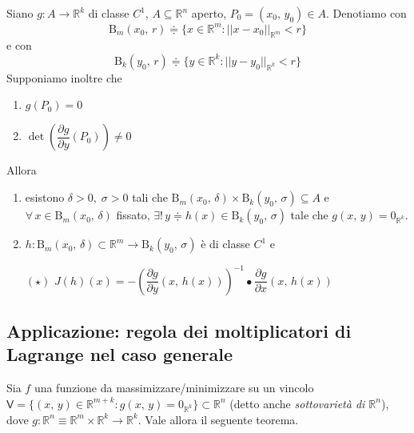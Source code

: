 \begin{thm}
Siano $g : A \longrightarrow \mathbb{R}^k$ di classe $C^1$, $A \subseteq \mathbb{R}^n$ aperto, $P_0 = (x_0,\,y_0) \in A$. Denotiamo con
$$
\mathrm{B}_m(x_0,\,r) \doteqdot \lbrace x \in \mathbb{R}^m : ||x-x_0||_{\mathbb{R}^m} < r \rbrace
$$
e con
$$
\mathrm{B}_k(y_0,\,r) \doteqdot \lbrace y \in \mathbb{R}^k : ||y-y_0||_{\mathbb{R}^k} < r \rbrace
$$
Supponiamo inoltre che
\begin{enumerate}[labelindent=\parindent,leftmargin=*,label=\textnormal{(\roman*)},start=1]
\item $g(P_0) = 0$
\item $\det \left( \dfrac{\partial g}{\partial y}(P_0) \right) \neq 0$
\end{enumerate}
Allora
\begin{enumerate}[labelindent=\parindent,leftmargin=*,label=\textnormal{(D\arabic*)},start=1]
\item esistono $\delta > 0,\; \sigma > 0$ tali che $\mathrm{B}_m(x_0,\,\delta) \times \mathrm{B}_k(y_0,\,\sigma) \subseteq A$ e $\forall \, x \in \mathrm{B}_m(x_0,\,\delta)$ fissato, $\exists ! \, y \doteqdot h(x) \in \mathrm{B}_k(y_0,\,\sigma)$ tale che $g(x,\,y) = 0_{\mathbb{R}^k}$.

\item $h : \mathrm{B}_m(x_0,\,\delta) \subset \mathbb{R}^m \longrightarrow \mathrm{B}_k(y_0,\,\sigma)$ è di classe $C^1$ e
\begin{center}
$\mathrm{(\star)}$
\hfill
$\displaystyle
J(h)(x) = -
\left( \dfrac{\partial g}{\partial y}(x,\,h(x)) \right)^{-1}
\bullet
\dfrac{\partial g}{\partial x}(x,\,h(x))
$
\hfill \null \\
\end{center}
\end{enumerate}
\begin{center}
\def\svgwidth{10cm}

\end{center}
\end{thm}

\subsection{Applicazione: regola dei moltiplicatori di Lagrange nel caso generale}
Sia $f$ una funzione da massimizzare/minimizzare su un vincolo $\mathsf{V} = \lbrace (x,\,y) \in \mathbb{R}^{m+k} : g(x,\,y) = 0_{\mathbb{R}^k} \rbrace \subset \mathbb{R}^n$ (detto anche \emph{sottovarietà di $\mathbb{R}^n$}), dove $g : \mathbb{R}^n \equiv \mathbb{R}^m \times \mathbb{R}^k \longrightarrow \mathbb{R}^k$. Vale allora il seguente teorema.

